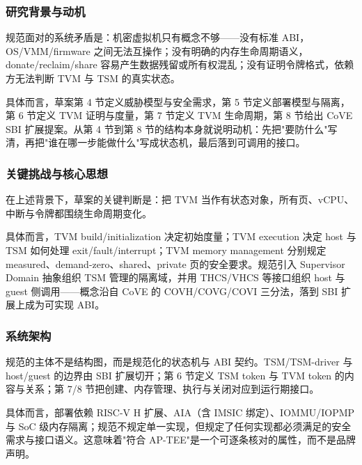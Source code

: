 \documentclass[11pt]{ctexart}
\begin{document}
\subsubsection{研究背景与动机}
规范面对的系统矛盾是：机密虚拟机只有概念不够——没有标准 ABI，OS/VMM/firmware 之间无法互操作；没有明确的内存生命周期语义，donate/reclaim/share 容易产生数据残留或所有权混乱；没有证明令牌格式，依赖方无法判断 TVM 与 TSM 的真实状态。\par
具体而言，草案第 4 节定义威胁模型与安全需求，第 5 节定义部署模型与隔离，第 6 节定义 TVM 证明与度量，第 7 节定义 TVM 生命周期，第 8 节给出 CoVE SBI 扩展提案。从第 4 节到第 8 节的结构本身就说明动机：先把"要防什么"写清，再把"谁在哪一步能做什么"写成状态机，最后落到可调用的接口。\par
\subsubsection{关键挑战与核心思想}
在上述背景下，草案的关键判断是：把 TVM 当作有状态对象，所有页、vCPU、中断与令牌都围绕生命周期变化。\par
具体而言，TVM build/initialization 决定初始度量；TVM execution 决定 host 与 TSM 如何处理 exit/fault/interrupt；TVM memory management 分别规定 measured、demand-zero、shared、private 页的安全要求。规范引入 Supervisor Domain 抽象组织 TSM 管理的隔离域，并用 THCS/VHCS 等接口组织 host 与 guest 侧调用——概念沿自 CoVE 的 COVH/COVG/COVI 三分法，落到 SBI 扩展上成为可实现 ABI。\par
\subsubsection{系统架构}
规范的主体不是结构图，而是规范化的状态机与 ABI 契约。TSM/TSM-driver 与 host/guest 的边界由 SBI 扩展切开；第 6 节定义 TSM token 与 TVM token 的内容与关系；第 7/8 节把创建、内存管理、执行与关闭对应到运行期接口。\par
具体而言，部署依赖 RISC-V H 扩展、AIA（含 IMSIC 绑定）、IOMMU/IOPMP 与 SoC 级内存隔离；规范不规定单一实现，但规定了任何实现都必须满足的安全需求与接口语义。这意味着"符合 AP-TEE"是一个可逐条核对的属性，而不是品牌声明。\par
\end{document}
